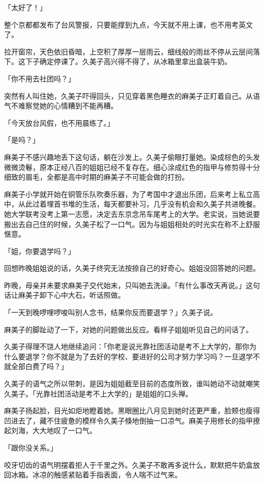 \documentclass[UTF8]{ctexart}
\begin{document}
    「太好了！」 

    整个京都都发布了台风警报，只要能撑到九点，今天就不用上课，也不用考英文了。 

    拉开窗帘，天色依旧昏暗，上空积了厚厚一层雨云，细线般的雨丝不停从云层间落下。这下子确定停课了。久美子高兴得不得了，从冰箱里拿出盒装牛奶。 

    「你不用去社团吗？」 

    突然有人叫住她，久美子吓得回头，只见穿着黑色睡衣的麻美子正盯着自己。从语气不难察觉她的心情糟到不能再糟。 

    「今天放台风假，也不用晨练了。」 

    「是吗？」 

    麻美子不感兴趣地丢下这句话，躺在沙发上。久美子偷眼打量她。染成棕色的头发微微烫鬈，原本正经八百的姐姐已经不复存在。细心涂成红色的指甲与修剪得十分细致的眉毛，全都是高中时期的麻美子不可能会做的打扮。 

    麻美子小学就开始在铜管乐队吹奏乐器，为了考国中才退出乐团，后来考上私立高中，从此过着埋首书堆的生活，每天都要补习，几乎没有机会和久美子共进晚餐。她大学联考没考上第一志愿，决定去东京念吊车尾考上的大学。老实说，当她说要搬出去自己住的时候，久美子松了一口气。因为与姐姐相处的时光实在称不上舒服惬意。 

    「姐，你要退学吗？」 

    回想昨晚姐姐说的话，久美子终究无法按捺自己的好奇心。姐姐没回答她的问题。 

    昨晚，母亲并未要求麻美子交代始末，只叫她去洗澡。「有什么事改天再说。」这句话让麻美子卸下心中大石，听话照做。 

    「一天到晚啰哩啰唆叫别人念书，结果你反而要退学？」久美子说。 

    麻美子的脚趾动了一下，对她的问题做出反应。看样子姐姐听见自己的问话了。 

    久美子得理不饶人地继续追问：「你老是说光靠社团活动是考不上大学的，那你为什么要退学？你不就是为了去好的学校、要进好的公司才努力学习吗？一旦退学不就全部白费了吗？」 

    久美子的语气之所以带刺，是因为姐姐截至目前的态度所致，谁叫她动不动就嘲笑久美子。「光靠社团活动是考不上大学的」是姐姐的口头禅。 

    麻美子扬起脸，目光如炬地瞪着她。黑眼圈比八月见到她时还更严重，脸颊也瘦得凹进去了，藏不住疲惫的模样令久美子倏地倒抽一口凉气。麻美子用修长的指甲撩起刘海，大大地叹了一口气。 

    「跟你没关系。」 

    咬牙切齿的语气明摆着拒人于千里之外。久美子不敢再多说什么，默默把牛奶盒放回冰箱。冰凉的触感紧贴着手指表面，令人喘不过气来。 
\end{document}
